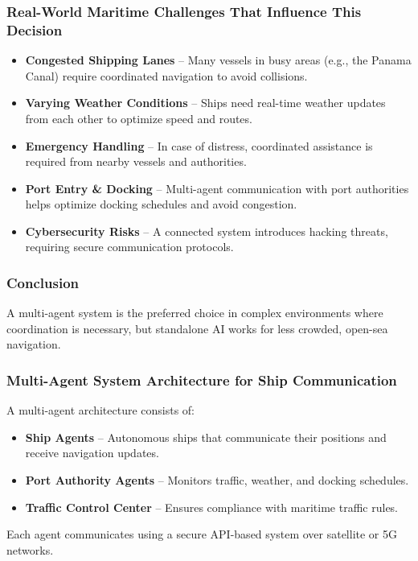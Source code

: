 \documentclass{article}
\begin{document}
\subsubsection{\large Real-World Maritime Challenges That Influence This Decision}
\begin{itemize}
    \item \textbf{Congested Shipping Lanes} – Many vessels in busy areas (e.g., the Panama Canal) require coordinated navigation to avoid collisions.
    \item \textbf{Varying Weather Conditions} – Ships need real-time weather updates from each other to optimize speed and routes.
    \item \textbf{Emergency Handling} – In case of distress, coordinated assistance is required from nearby vessels and authorities.
    \item \textbf{Port Entry \& Docking} – Multi-agent communication with port authorities helps optimize docking schedules and avoid congestion.
    \item \textbf{Cybersecurity Risks} – A connected system introduces hacking threats, requiring secure communication protocols.
\end{itemize}

\subsubsection{Conclusion}
A multi-agent system is the preferred choice in complex environments where coordination is necessary, but standalone AI works for less crowded, open-sea navigation.

\subsubsection{\large Multi-Agent System Architecture for Ship Communication}

A multi-agent architecture consists of:
\begin{itemize}
    \item \textbf{Ship Agents} – Autonomous ships that communicate their positions and receive navigation updates.
    \item \textbf{Port Authority Agents} – Monitors traffic, weather, and docking schedules.
    \item \textbf{Traffic Control Center} – Ensures compliance with maritime traffic rules.
\end{itemize}

Each agent communicates using a secure API-based system over satellite or 5G networks.
\end{document}
